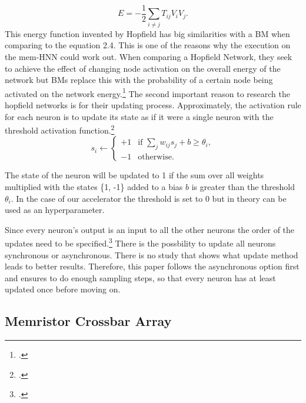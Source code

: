 \begin{equation}
    E = -\frac{1}{2} \sum_{i \neq j} T_{ij} V_i V_j .
\end{equation}
This energy function invented by Hopfield has big similarities with a \ac{BM} when comparing to the
equation 2.4. This is one of the reasons why the execution on the \ac{mem-HNN} could work out.
When comparing a Hopfield Network, they seek to achieve the effect of changing node activation on the overall energy of the network but \ac{BM}s replace this with the probability of a certain node being activated on the network energy.\footcite[cf.][7]{ahadNeuralNetworksWireless2016}
The second important reason to research the hopfield networks is for their updating process.
Approximately, the activation rule for each neuron is to update its state as if it were a single neuron with the threshold activation function.\footcite[cf.][506]{mackayInformationTheoryInference2003}
\begin{equation}
    s_i \leftarrow 
    \begin{cases} 
    +1 & \text{if } \sum_j w_{ij} s_j + b \geq \theta_i, \\
    -1 & \text{otherwise}.
    \end{cases}
    \label{eq:update_rule}
\end{equation}
    
The state of the neuron will be updated to 1 if the sum over all weights multiplied with the states \{1, -1\} added to a bias \( b \)  is greater than the threshold \( \theta_i \).
In the case of our accelerator the threshold is set to 0 but in theory can be used as an hyperparameter.

Since every neuron's output is an input to all the other neurons the order of the updates need to be specified.\footcite[cf.][506]{mackayInformationTheoryInference2003}
There is the possbility to update all neurons synchronous or asynchronous. 
There is no study that shows what update method leads to better results.
Therefore, this paper follows the asynchronous option first and ensures to do enough sampling steps, so that every neuron has at least updated once before moving on. 

\subsection{Memristor Crossbar Array}

